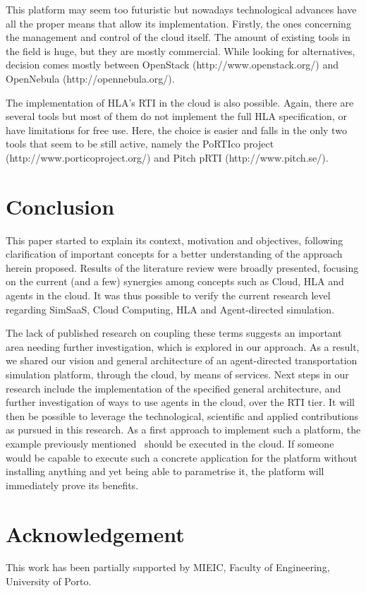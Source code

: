 \documentclass[conference]{IEEEtran}
\begin{document}
This platform may seem too futuristic but nowadays technological advances have all the proper means that allow its implementation. Firstly, the ones concerning the management and control of the cloud itself. The amount of existing tools in the field is huge, but they are mostly commercial. While looking for alternatives, decision comes mostly between OpenStack (http://www.openstack.org/) and OpenNebula (http://opennebula.org/).

The implementation of HLA's RTI in the cloud is also possible. Again, there are several tools but most of them do not implement the full HLA specification, or have limitations for free use. Here, the choice is easier and falls in the only two tools that seem to be still active, namely the PoRTIco project (http://www.porticoproject.org/) and Pitch pRTI (http://www.pitch.se/).


\section{Conclusion}

This paper started to explain its context, motivation and objectives, following clarification of important concepts for a better understanding of the approach herein proposed. Results of the literature review were broadly presented, focusing on the current (and a few) synergies among concepts such as Cloud, HLA and agents in the cloud. It was thus possible to verify the current research level regarding SimSaaS, Cloud Computing, HLA and Agent-directed simulation. 

The lack of published research on coupling these terms suggests an important area needing further investigation, which is explored in our approach. As a result, we shared our vision and general architecture of an agent-directed transportation simulation platform, through the cloud, by means of services. Next steps in our research include the implementation of the specified general architecture, and further investigation of ways to use agents in the cloud, over the RTI tier. It will then be possible to leverage the technological, scientific and applied contributions as pursued in this research. As a first approach to implement such a platform, the example previously mentioned~\cite{macedo2013integrated} should be executed in the cloud. If someone would be capable to execute such a concrete application for the platform without installing anything and yet being able to parametrise it, the platform will immediately prove its benefits.

\section*{Acknowledgement}
This work has been partially supported by MIEIC, Faculty of Engineering, University of Porto.







\end{document}
